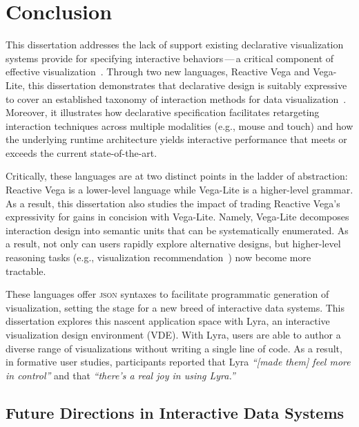 \chapter{Conclusion}
\label{sec:conclusion}

This dissertation addresses the lack of support existing declarative
visualization systems provide for specifying interactive behaviors\,---\,a
critical component of effective
visualization~\cite{pike:interactionscience,yi:understanding}. Through two new
languages, Reactive Vega and Vega-Lite, this dissertation demonstrates that
declarative design is suitably expressive to cover an established taxonomy of
interaction methods for data visualization~\cite{yi:understanding}. Moreover, it
illustrates how declarative specification facilitates retargeting interaction
techniques across multiple modalities (e.g., mouse and touch) and how the
underlying runtime architecture yields interactive performance that meets or
exceeds the current state-of-the-art.

Critically, these languages are at two distinct points in the ladder of
abstraction: Reactive Vega is a lower-level language while Vega-Lite is a
higher-level grammar. As a result, this dissertation also studies the impact of
trading Reactive Vega's expressivity for gains in concision with Vega-Lite.
Namely, Vega-Lite decomposes interaction design into semantic units that can be
systematically enumerated. As a result, not only can users rapidly explore
alternative designs, but higher-level reasoning tasks (e.g., visualization
recommendation~\cite{compassql}) now become more tractable.

These languages offer \textsc{json} syntaxes to facilitate programmatic
generation of visualization, setting the stage for a new breed of interactive
data systems. This dissertation explores this nascent application space with
Lyra, an interactive visualization design environment (VDE). With Lyra, users
are able to author a diverse range of visualizations without writing a single
line of code. As a result, in formative user studies, participants reported that
Lyra \emph{``[made them] feel more in control''} and that \emph{``there's a real
joy in using Lyra.''}

\section{Future Directions in Interactive Data Systems}

\vspace{-10pt}

